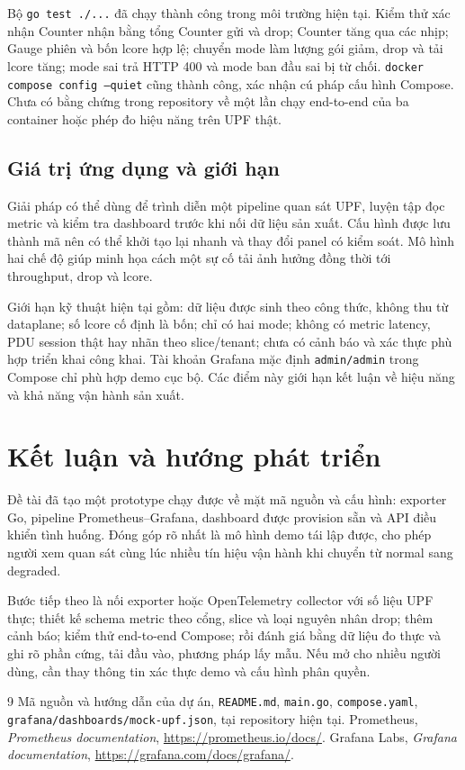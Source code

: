 \documentclass[12pt,a4paper]{report}
\newcommand{\code}[1]{\texttt{#1}}
\begin{document}
Bộ \code{go test ./...} đã chạy thành công trong môi trường hiện tại. Kiểm thử xác nhận Counter nhận bằng tổng Counter gửi và drop; Counter tăng qua các nhịp; Gauge phiên và bốn lcore hợp lệ; chuyển mode làm lượng gói giảm, drop và tải lcore tăng; mode sai trả HTTP 400 và mode ban đầu sai bị từ chối. \code{docker compose config --quiet} cũng thành công, xác nhận cú pháp cấu hình Compose. Chưa có bằng chứng trong repository về một lần chạy end-to-end của ba container hoặc phép đo hiệu năng trên UPF thật.

\section{Giá trị ứng dụng và giới hạn}
Giải pháp có thể dùng để trình diễn một pipeline quan sát UPF, luyện tập đọc metric và kiểm tra dashboard trước khi nối dữ liệu sản xuất. Cấu hình được lưu thành mã nên có thể khởi tạo lại nhanh và thay đổi panel có kiểm soát. Mô hình hai chế độ giúp minh họa cách một sự cố tải ảnh hưởng đồng thời tới throughput, drop và lcore.

Giới hạn kỹ thuật hiện tại gồm: dữ liệu được sinh theo công thức, không thu từ dataplane; số lcore cố định là bốn; chỉ có hai mode; không có metric latency, PDU session thật hay nhãn theo slice/tenant; chưa có cảnh báo và xác thực phù hợp triển khai công khai. Tài khoản Grafana mặc định \code{admin/admin} trong Compose chỉ phù hợp demo cục bộ. Các điểm này giới hạn kết luận về hiệu năng và khả năng vận hành sản xuất.

\chapter{Kết luận và hướng phát triển}
Đề tài đã tạo một prototype chạy được về mặt mã nguồn và cấu hình: exporter Go, pipeline Prometheus--Grafana, dashboard được provision sẵn và API điều khiển tình huống. Đóng góp rõ nhất là mô hình demo tái lập được, cho phép người xem quan sát cùng lúc nhiều tín hiệu vận hành khi chuyển từ normal sang degraded.

Bước tiếp theo là nối exporter hoặc OpenTelemetry collector với số liệu UPF thực; thiết kế schema metric theo cổng, slice và loại nguyên nhân drop; thêm cảnh báo; kiểm thử end-to-end Compose; rồi đánh giá bằng dữ liệu đo thực và ghi rõ phần cứng, tải đầu vào, phương pháp lấy mẫu. Nếu mở cho nhiều người dùng, cần thay thông tin xác thực demo và cấu hình phân quyền.

\begin{thebibliography}{9}
 Mã nguồn và hướng dẫn của dự án, \code{README.md}, \code{main.go}, \code{compose.yaml}, \code{grafana/dashboards/mock-upf.json}, tại repository hiện tại.
 Prometheus, \emph{Prometheus documentation}, \url{https://prometheus.io/docs/}.
 Grafana Labs, \emph{Grafana documentation}, \url{https://grafana.com/docs/grafana/}.
\end{thebibliography}
\end{document}
